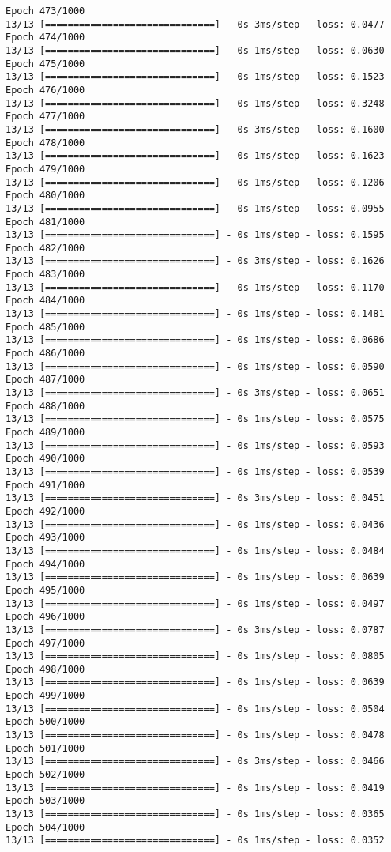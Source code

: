 \documentclass[11pt]{article}
\begin{document}
\begin{Verbatim}[commandchars=\\\{\}]
Epoch 473/1000
13/13 [==============================] - 0s 3ms/step - loss: 0.0477
Epoch 474/1000
13/13 [==============================] - 0s 1ms/step - loss: 0.0630
Epoch 475/1000
13/13 [==============================] - 0s 1ms/step - loss: 0.1523
Epoch 476/1000
13/13 [==============================] - 0s 1ms/step - loss: 0.3248
Epoch 477/1000
13/13 [==============================] - 0s 3ms/step - loss: 0.1600
Epoch 478/1000
13/13 [==============================] - 0s 1ms/step - loss: 0.1623
Epoch 479/1000
13/13 [==============================] - 0s 1ms/step - loss: 0.1206
Epoch 480/1000
13/13 [==============================] - 0s 1ms/step - loss: 0.0955
Epoch 481/1000
13/13 [==============================] - 0s 1ms/step - loss: 0.1595
Epoch 482/1000
13/13 [==============================] - 0s 3ms/step - loss: 0.1626
Epoch 483/1000
13/13 [==============================] - 0s 1ms/step - loss: 0.1170
Epoch 484/1000
13/13 [==============================] - 0s 1ms/step - loss: 0.1481
Epoch 485/1000
13/13 [==============================] - 0s 1ms/step - loss: 0.0686
Epoch 486/1000
13/13 [==============================] - 0s 1ms/step - loss: 0.0590
Epoch 487/1000
13/13 [==============================] - 0s 3ms/step - loss: 0.0651
Epoch 488/1000
13/13 [==============================] - 0s 1ms/step - loss: 0.0575
Epoch 489/1000
13/13 [==============================] - 0s 1ms/step - loss: 0.0593
Epoch 490/1000
13/13 [==============================] - 0s 1ms/step - loss: 0.0539
Epoch 491/1000
13/13 [==============================] - 0s 3ms/step - loss: 0.0451
Epoch 492/1000
13/13 [==============================] - 0s 1ms/step - loss: 0.0436
Epoch 493/1000
13/13 [==============================] - 0s 1ms/step - loss: 0.0484
Epoch 494/1000
13/13 [==============================] - 0s 1ms/step - loss: 0.0639
Epoch 495/1000
13/13 [==============================] - 0s 1ms/step - loss: 0.0497
Epoch 496/1000
13/13 [==============================] - 0s 3ms/step - loss: 0.0787
Epoch 497/1000
13/13 [==============================] - 0s 1ms/step - loss: 0.0805
Epoch 498/1000
13/13 [==============================] - 0s 1ms/step - loss: 0.0639
Epoch 499/1000
13/13 [==============================] - 0s 1ms/step - loss: 0.0504
Epoch 500/1000
13/13 [==============================] - 0s 1ms/step - loss: 0.0478
Epoch 501/1000
13/13 [==============================] - 0s 3ms/step - loss: 0.0466
Epoch 502/1000
13/13 [==============================] - 0s 1ms/step - loss: 0.0419
Epoch 503/1000
13/13 [==============================] - 0s 1ms/step - loss: 0.0365
Epoch 504/1000
13/13 [==============================] - 0s 1ms/step - loss: 0.0352

\end{Verbatim}
\end{document}
